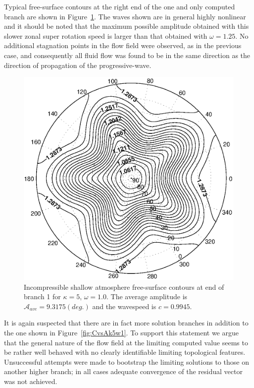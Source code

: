 Typical free-surface contours at the right end of the one and only computed branch are shown in Figure~\ref{fig:k5w1fsend}. The waves shown are in general highly nonlinear and it should be noted that the maximum possible amplitude obtained with this slower zonal super rotation speed is larger than that obtained with $\omega=1.25$. No additional stagnation points in the flow field were observed, as in the previous case, and consequently all fluid flow was found to be in the same direction as the direction of propagation of the progressive-wave. 

\begin{figure}[htbp]
	\centering
		\includegraphics[scale=0.75]{IMAGES/k5w1fsend.eps}
	\caption{Incompressible shallow atmosphere free-surface contours at end of branch 1 for $\kappa=5$, $\omega=1.0$. The average amplitude is $\mathcal{A}_{ave}=9.3175 (deg.)$ and the wavespeed is $c=0.9945$.}
	\label{fig:k5w1fsend}
\end{figure}

It is again suspected that there are in fact more solution branches in addition to the one shown in Figure~\ref{fig:CvsAk5w1}. To support this statement we argue that the general nature of the flow field at the limiting computed value seems to be rather well behaved with no clearly identifiable limiting topological features. Unsuccessful attempts were made to bootstrap the limiting solutions to those on another higher branch; in all cases adequate convergence of the residual vector was not achieved. 

